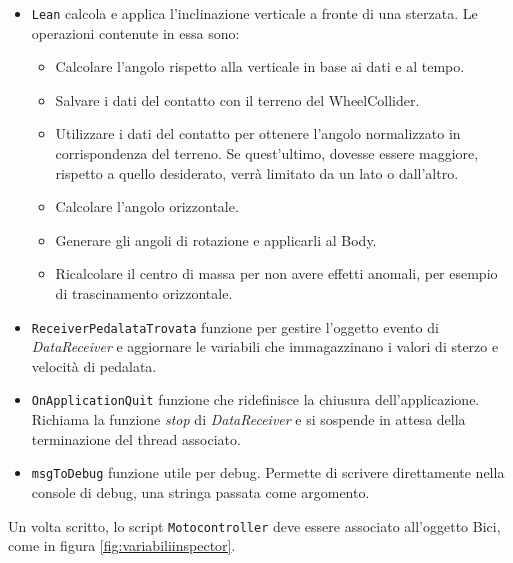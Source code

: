 \begin{itemize}
\begin{itemize}
		\end{itemize}
		
		\item \texttt{Lean} calcola e applica l’inclinazione verticale a fronte di una sterzata. Le operazioni contenute in essa sono:
		\begin{itemize}
			\item Calcolare l’angolo rispetto alla verticale in base ai dati e al tempo.
			\item Salvare i dati del contatto con il terreno del WheelCollider.
			\item Utilizzare i dati del contatto per ottenere l’angolo normalizzato in corrispondenza del terreno. Se quest’ultimo, dovesse essere maggiore, rispetto a quello desiderato, verrà limitato da un lato o dall’altro.
			\item Calcolare l’angolo orizzontale.
			\item Generare gli angoli di rotazione e applicarli al Body.
			\item Ricalcolare il centro di massa per non avere effetti anomali, per esempio di trascinamento orizzontale.
		\end{itemize}
		
		\item \texttt{ReceiverPedalataTrovata} funzione per gestire l'oggetto evento di \textit{DataReceiver} e aggiornare le variabili che immagazzinano i valori di sterzo e velocità di pedalata.
		\item \texttt{OnApplicationQuit} funzione che ridefinisce la chiusura dell'applicazione. Richiama la funzione \textit{stop} di \textit{DataReceiver} e si sospende in attesa della terminazione del thread associato.
		\item \texttt{msgToDebug} funzione utile per debug. Permette di scrivere direttamente nella console di debug, una stringa passata come argomento.
	
\end{itemize}

\noindent Un volta scritto, lo script \texttt{Motocontroller} deve essere associato all'oggetto Bici, come in figura \ref{fig:variabiliinspector}. 

